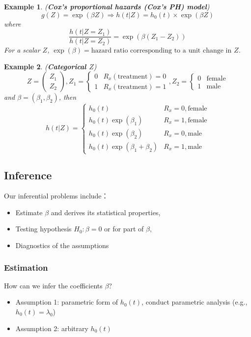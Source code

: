 \documentclass[11pt,addpoints,answers]{exam}
\newtheorem{example}{Example}
\begin{document}
\begin{CJK*}{UTF8}{gbsn}
\begin{example}{({\bf Cox's proportional hazards (Cox's PH) model})}
$$
g(Z) = \exp(\beta Z) \Rightarrow h(t|Z) = h_0(t) \times \exp(\beta Z)
$$
where
$$
\frac{h(t|Z=Z_1)}{h(t|Z=Z_2)} = \exp(\beta(Z_1 - Z_2))
$$
For a scalar $Z$, $\exp(\beta) = \mbox{hazard ratio corresponding to a unit change in }Z$.
\end{example}

\begin{example}{({\bf Categorical $Z$})}
$$
Z = \begin{pmatrix}
Z_1\\
Z_2
\end{pmatrix}, Z_1 = \begin{cases}
0 & R_x (\mbox{treatment}) = 0\\
1 & R_x (\mbox{treatment}) = 1
\end{cases}, Z_2 = \begin{cases}
0 & \mbox{female}\\
1 & \mbox{male}
\end{cases}
$$
and $\beta = (\beta_1, \beta_2)$, 
then
$$
h(t|Z) = \begin{cases}
h_0(t) & R_x = 0, \mbox{female}\\
h_0(t)\exp(\beta_1) & R_x = 1, \mbox{female}\\
h_0(t)\exp(\beta_2) & R_x = 0, \mbox{male}\\
h_0(t)\exp(\beta_1+\beta_2) & R_x=1, \mbox{male}
\end{cases}
$$
\end{example}

\subsection{Inference}

Our inferential problems include：
\begin{itemize}
	\item Estimate $\beta$ and derives its statistical properties,
	\item Testing hypothesis $H_0: \beta=0$ or for part of $\beta$,
	\item Diagnostics of the assumptions
\end{itemize}


\subsubsection{Estimation}
How can we infer the coefficients $\beta$?
\begin{itemize}
	\item Assumption 1: parametric form of $h_0(t)$, conduct parametric analysis 
		(e.g., $h_0(t) = \lambda_0$)
	\item Assumption 2: arbitrary $h_0(t)$
\end{itemize}


\end{CJK*}
\end{document}
